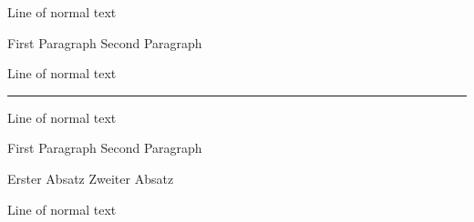 \documentclass{article}
\begin{document}
Line of normal text

\beginnumbering
\pstart First Paragraph\pend
\pstart Second Paragraph\pend
\endnumbering

Line of normal text

\bigskip
\hrule
\bigskip

Line of normal text

\begin{pairs}
   \begin{Leftside}
      \beginnumbering
      \pstart First Paragraph\pend
      \pstart Second Paragraph\pend
      \endnumbering
   \end{Leftside}
   \begin{Rightside}
      \beginnumbering
      \pstart Erster Absatz\pend
      \pstart Zweiter Absatz\pend
      \endnumbering
   \end{Rightside}
\end{pairs}
\Columns

Line of normal text
\end{document}
